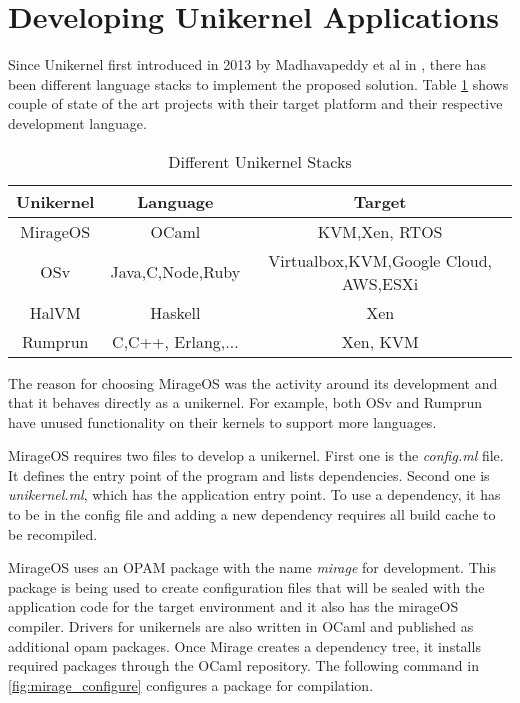 
\section{Developing Unikernel Applications}

Since Unikernel first introduced in 2013 by Madhavapeddy et al in \cite{library-operating-system}, there has been different language stacks to implement the proposed solution. Table \ref{tab:stacks} shows couple of state of the art projects with their target platform and their respective development language.

\begin{table}[htpb]
    \caption[Different Unikernel Stacks]{Different Unikernel Stacks}\label{tab:stacks}
    \centering
    \begin{tabular}{ |c |c |c| }
      \toprule
        Unikernel & Language & Target \\
      \midrule
        MirageOS & OCaml & KVM,Xen, RTOS \\
        \hline
        OSv & Java,C,Node,Ruby & Virtualbox,KVM,Google Cloud, AWS,ESXi \\
        \hline
        HalVM & Haskell & Xen \\
      \hline
        Rumprun & C,C++, Erlang,... &  Xen, KVM \\
      \bottomrule
    \end{tabular}
  \end{table}

The reason for choosing MirageOS was the activity around its development and that it behaves directly as a unikernel. For example, both OSv and Rumprun have unused functionality on their kernels to support more languages.

MirageOS requires two files to develop a unikernel. First one is the \textit{config.ml} file. It defines the entry point of the program and lists dependencies. Second one is \textit{unikernel.ml}, which has the application entry point. To use a dependency, it has to be in the config file and adding a new dependency requires all build cache to be recompiled.

MirageOS uses an OPAM package with the name \textit{mirage} \cite{opammirage} for development. This package is being used to create configuration files that will be sealed with the application code for the target environment and it also has the mirageOS compiler. Drivers for unikernels are also written in OCaml and published as additional opam packages. Once Mirage creates a dependency tree, it installs required packages through the OCaml repository. The following command in \ref{fig:mirage_configure} configures a package for compilation.

